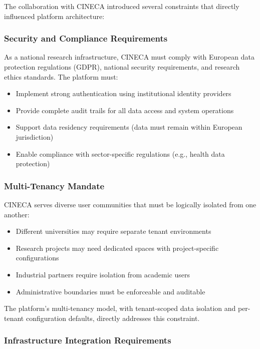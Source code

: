The collaboration with CINECA introduced several constraints that directly influenced platform architecture:

\subsubsection{Security and Compliance Requirements}

As a national research infrastructure, CINECA must comply with European data protection regulations (GDPR), national security requirements, and research ethics standards. The platform must:

\begin{itemize}
    \item Implement strong authentication using institutional identity providers
    \item Provide complete audit trails for all data access and system operations
    \item Support data residency requirements (data must remain within European jurisdiction)
    \item Enable compliance with sector-specific regulations (e.g., health data protection)
\end{itemize}

\subsubsection{Multi-Tenancy Mandate}

CINECA serves diverse user communities that must be logically isolated from one another:

\begin{itemize}
    \item Different universities may require separate tenant environments
    \item Research projects may need dedicated spaces with project-specific configurations
    \item Industrial partners require isolation from academic users
    \item Administrative boundaries must be enforceable and auditable
\end{itemize}

The platform's multi-tenancy model, with tenant-scoped data isolation and per-tenant configuration defaults, directly addresses this constraint.

\subsubsection{Infrastructure Integration Requirements}

